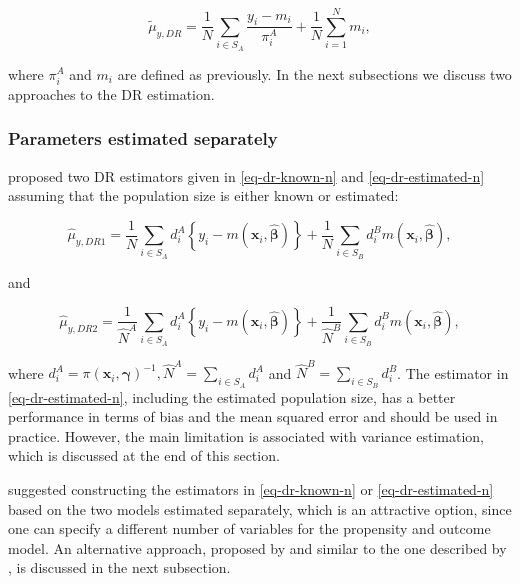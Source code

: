 \documentclass[
]{jss}
\begin{document}
\[
\tilde{\mu}_{y,DR} = \frac{1}{N}\sum_{i \in S_A}\frac{y_i - m_i}{\pi_i^A} + \frac{1}{N}\sum_{i =1}^N m_i,
\]

where \(\pi_i^A\) and \(m_i\) are defined as previously. In the next
subsections we discuss two approaches to the DR estimation.

\subsubsection{Parameters estimated
separately}\label{parameters-estimated-separately}

\citet{chen2020doubly} proposed two DR estimators given in
\eqref{eq-dr-known-n} and \eqref{eq-dr-estimated-n} assuming that the
population size is either known or estimated:

\begin{equation}
\hat{\mu}_{y,DR1}=\frac{1}{N} \sum_{i \in S_{A}} d_i^{A}\left\{y_i-m\left(\boldsymbol{x}_i, \hat{\boldsymbol{\beta}}\right)\right\}+\frac{1}{N} \sum_{i \in S_{B}} d_i^{B} m\left(\boldsymbol{x}_i, \hat{\boldsymbol{\beta}}\right),
\label{eq-dr-known-n}
\end{equation}

and

\begin{equation}
\hat{\mu}_{y,DR2}=\frac{1}{\hat{N}^{A}} \sum_{i \in S_{A}} d_i^{A}\left\{y_i-m\left(\boldsymbol{x}_i, \hat{\boldsymbol{\beta}}\right)\right\}+\frac{1}{\hat{N}^{B}} \sum_{i \in S_{B}} d_i^{B} m\left(\boldsymbol{x}_i, \hat{\boldsymbol{\beta}}\right),
\label{eq-dr-estimated-n}
\end{equation}

where
\(d_i^A=\pi\left(\boldsymbol{x}_i, \boldsymbol{\gamma}\right)^{-1}, \hat{N}^A=\sum_{i \in S_A} d_i^A\)
and \(\hat{N}^B=\sum_{i \in S_B} d_i^B\). The estimator in
\eqref{eq-dr-estimated-n}, including the estimated population size, has
a better performance in terms of bias and the mean squared error and
should be used in practice. However, the main limitation is associated
with variance estimation, which is discussed at the end of this section.

\citet{chen2020doubly} suggested constructing the estimators in
\eqref{eq-dr-known-n} or \eqref{eq-dr-estimated-n} based on the two
models estimated separately, which is an attractive option, since one
can specify a different number of variables for the propensity and
outcome model. An alternative approach, proposed by
\citet{yang_doubly_2020} and similar to the one described by
\citet{kim2014doubly}, is discussed in the next subsection.
\end{document}
